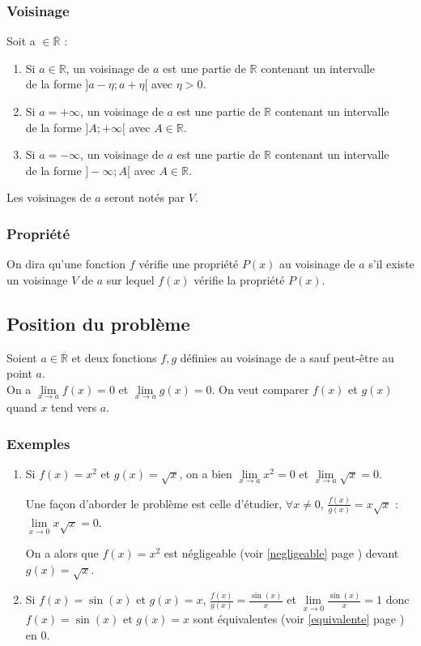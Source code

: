\documentclass[a4paper,10pt]{book} %
\newcommand{\R}{\mathbb{R}}
\newcommand{\Rb}{\overline{\mathbb{R}}}
\begin{document}
\subsubsection{Voisinage}
Soit a $\in \Rb$ :
\begin{enumerate}
\item Si $a \in \R$, un voisinage de $a$ est une partie de $\R$ contenant un intervalle\\ de la forme $]a-\eta ; a+\eta[$ avec $\eta>0$.
\item Si $a =+\infty$, un voisinage de $a$ est une partie de $\R$ contenant un intervalle\\ de la forme $]A;+\infty[$ avec $A\in \R$.
\item Si $a = -\infty$, un voisinage de $a$ est une partie de $\R$ contenant un intervalle\\ de la forme $]-\infty ; A[$ avec $A\in \R$.
\end{enumerate}

\bigskip

Les voisinages de $a$ seront notés par $V$.

\subsubsection{Propriété}
On dira qu'une fonction $f$ vérifie une propriété $P(x)$ au voisinage de $a$ s'il existe un voisinage $V$ de $a$ sur lequel $f(x)$ vérifie la propriété $P(x)$.

\subsection{Position du problème}
Soient $a\in\Rb$ et deux fonctions $f,g$ définies au voisinage de a sauf peut-être au point $a$.\\
On a $\lim\limits_{x\rightarrow a}f(x)=0$ et $\lim\limits_{x\rightarrow a}g(x)=0$. On veut comparer $f(x)$ et $g(x)$ quand $x$ tend vers $a$.

\subsubsection{Exemples}
\begin{enumerate}
\item Si $f(x)=x^2$ et $g(x)=\sqrt{x}$, on a bien $\lim\limits_{x\rightarrow a}x^2=0$ et $\lim\limits_{x\rightarrow a}\sqrt{x}=0$.

Une façon d'aborder le problème est celle d'étudier, $\forall x\neq 0$, $\frac{f(x)}{g(x)}=x\sqrt{x}$ : $\lim\limits_{x\rightarrow 0}x\sqrt{x}=0$.

On a alors que $f(x)=x^2$ est négligeable (voir \ref{negligeable} page \pageref{negligeable}) devant $g(x)=\sqrt{x}$.\\

\item
Si $f(x)=\sin(x)$ et $g(x)=x$, $\frac{f(x)}{g(x)}=\frac{\sin(x)}{x}$ et $\lim\limits_{x\rightarrow 0} \frac{\sin(x)}{x}=1$ donc $f(x)=\sin(x)$ et $g(x)=x$ sont équivalentes (voir \ref{equivalente} page \pageref{equivalente}) en $0$.
\end{enumerate}
\end{document}
